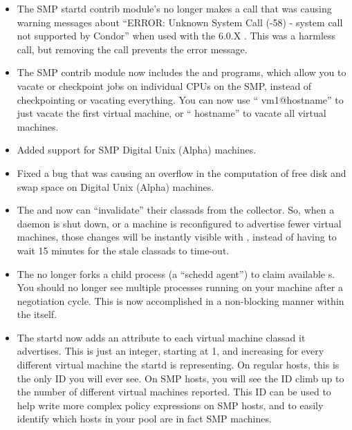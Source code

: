 \begin{itemize}
\item The SMP startd contrib module's  no longer makes
a call that was causing warning messages about ``ERROR: Unknown System
Call (-58) - system call not supported by Condor'' when used with the
6.0.X .
This was a harmless call, but removing the call prevents the error
message.

\item The SMP contrib module now includes the  and
 programs, which allow you to vacate or checkpoint jobs
on individual CPUs on the SMP, instead of checkpointing or vacating
everything.  
You can now use `` vm1@hostname'' to just vacate the
first virtual machine, or `` hostname'' to vacate all
virtual machines. 

\item Added support for SMP Digital Unix (Alpha) machines.

\item Fixed a bug that was causing an overflow in the computation of
free disk and swap space on Digital Unix (Alpha) machines.

\item The  and  now can ``invalidate''
their classads from the collector.
So, when a daemon is shut down, or a machine is reconfigured to 
advertise fewer virtual machines, those changes will be instantly
visible with , instead of having to wait 15 minutes for
the stale classads to time-out.

\item The  no longer forks a child process (a ``schedd
agent'') to claim available s.  
You should no longer see multiple  processes running on
your machine after a negotiation cycle.
This is now accomplished in a non-blocking manner within the
 itself.

\item The startd now adds an  attribute to
each virtual machine classad it advertises.
This is just an integer, starting at 1, and increasing for every
different virtual machine the startd is representing.
On regular hosts, this is the only ID you will ever see.
On SMP hosts, you will see the ID climb up to the number of different
virtual machines reported.
This ID can be used to help write more complex policy expressions on
SMP hosts, and to easily identify which hosts in your pool are in fact
SMP machines.


\end{itemize}
